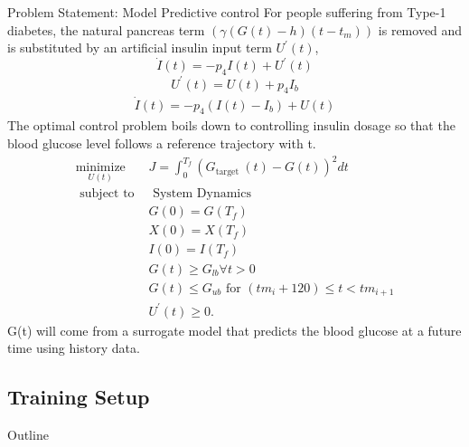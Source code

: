 \documentclass[8pt,xcolor=dvipsnames,compress]{beamer}
\begin{document}
\begin{frame}{Problem Statement: Model Predictive control}
    \vfill
\footnotesize
For people suffering from Type-1 diabetes, the natural pancreas term $\left(\gamma(G(t)-h)\left(t-t_{m}\right)\right)$ is removed and is substituted by an artificial insulin input term $U^{\prime}(t)$,
\begin{equation*}
\dot{I}(t)=-p_{4} I(t)+U^{\prime}(t)
\end{equation*}
\begin{equation*}
U^{\prime}(t)=U(t)+p_{4} I_{b} \tag{13}
\end{equation*}
\begin{gather*}
\dot{I}(t)=-p_{4}\left(I(t)-I_{b}\right)+U(t) \tag{16}
\end{gather*}
The optimal control problem boils down to controlling insulin dosage so that the blood glucose level follows a reference trajectory with t.
$$
\begin{array}{cl}
\underset{U(t)}{\operatorname{minimize}} & J=\int_{0}^{T_{f}}\left(G_{\text {target }}(t)-G(t)\right)^{2} d t \\
\text { subject to } & \text { System Dynamics } \\
& G(0)=G\left(T_{f}\right) \\
& X(0)=X\left(T_{f}\right) \\
& I(0)=I\left(T_{f}\right) \\
& G(t) \geq G_{l b} \forall t>0 \\
& G(t) \leq G_{u b} \text { for }\left(t m_{i}+120\right) \leq t<t m_{i+1} \\
& U^{\prime}(t) \geq 0 . \tag{30h}
\end{array}
$$
G(t) will come from a surrogate model that predicts the blood glucose at a future time using history data.

\end{frame}

\subsection{Training Setup}
\begin{frame}{Outline}
\end{frame}
\end{document}

